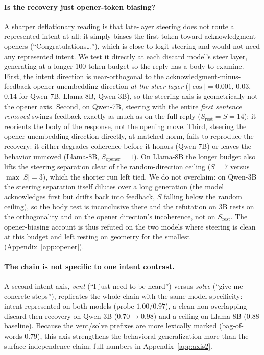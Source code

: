 \documentclass[11pt]{article}
\begin{document}
\paragraph{Is the recovery just opener-token biasing?} A sharper deflationary reading is that late-layer
steering does not route a represented intent at all: it simply biases the first token toward acknowledgment
openers (``Congratulations\dots''), which is close to logit-steering and would not need any represented intent.
We test it directly at each discard model's steer layer, generating at a longer $100$-token budget so the reply
has a body to examine. First, the intent direction is near-orthogonal to the acknowledgment-minus-feedback
opener-unembedding direction \emph{at the steer layer} ($|\cos|{=}0.001$, $0.03$, $0.14$ for Qwen-7B, Llama-8B,
Qwen-3B), so the steering axis is geometrically not the opener axis. Second, on Qwen-7B, steering with the entire
\emph{first sentence removed} swings feedback exactly as much as on the full reply
($S_{\mathrm{rest}}{=}S{=}14$): it reorients the body of the response, not the opening move. Third, steering the
opener-unembedding direction directly, at matched norm, fails to reproduce the recovery: it either degrades
coherence before it honors (Qwen-7B) or leaves the behavior unmoved (Llama-8B, $S_{\mathrm{opener}}{=}1$). On
Llama-8B the longer budget also lifts the steering separation clear of the random-direction ceiling ($S{=}7$
versus $\max|S|{=}3$), which the shorter run left tied. We do not overclaim: on Qwen-3B the steering separation
itself dilutes over a long generation (the model acknowledges first but drifts back into feedback, $S$ falling
below the random ceiling), so the body test is inconclusive there and the refutation on 3B rests on the
orthogonality and on the opener direction's incoherence, not on $S_{\mathrm{rest}}$. The opener-biasing account
is thus refuted on the two models where steering is clean at this budget and left resting on geometry for the
smallest (Appendix~\ref{app:opener}).

\paragraph{The chain is not specific to one intent contrast.} A second intent axis, \emph{vent} (``I just need
to be heard'') versus \emph{solve} (``give me concrete steps''), replicates the whole chain with the same
model-specificity: intent represented on both models (probe $1.00$/$0.97$), a clean non-overlapping
discard-then-recovery on Qwen-3B ($0.70 \to 0.98$) and a ceiling on Llama-8B ($0.88$ baseline). Because the
vent/solve prefixes are more lexically marked (bag-of-words $0.79$), this axis strengthens the
behavioral generalization more than the surface-independence claim; full numbers in Appendix~\ref{app:axis2}.
\end{document}
